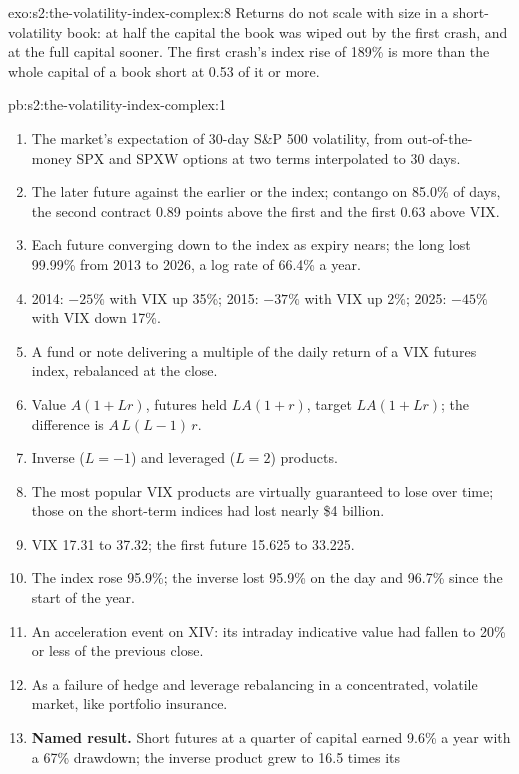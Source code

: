 \begin{solution}{exo:s2:the-volatility-index-complex:8}
Returns do not scale with size in a short-volatility book: at half the capital the book was wiped out by the first crash, and at the full capital
sooner. The first crash's index rise of 189\% is more than the whole capital of a book short at 0.53 of it or more.
\end{solution}

\begin{solution}{pb:s2:the-volatility-index-complex:1}
\begin{enumerate}
\item The market's expectation of 30-day S\&P 500 volatility, from out-of-the-money SPX and SPXW options at two terms interpolated to 30 days.
\item The later future against the earlier or the index; contango on 85.0\% of days, the second contract 0.89 points above the first and the first
0.63 above VIX.
\item Each future converging down to the index as expiry nears; the long lost 99.99\% from 2013 to 2026, a log rate of 66.4\% a year.
\item 2014: $-25\%$ with VIX up 35\%; 2015: $-37\%$ with VIX up 2\%; 2025: $-45\%$ with VIX down 17\%.
\item A fund or note delivering a multiple of the daily return of a VIX futures index, rebalanced at the close.
\item Value $A(1 + Lr)$, futures held $LA(1 + r)$, target $LA(1 + Lr)$; the difference is $A\,L(L - 1)\,r$.
\item Inverse ($L = -1$) and leveraged ($L = 2$) products.
\item The most popular VIX products are virtually guaranteed to lose over time; those on the short-term indices had lost nearly \$4 billion.
\item VIX 17.31 to 37.32; the first future 15.625 to 33.225.
\item The index rose 95.9\%; the inverse lost 95.9\% on the day and 96.7\% since the start of the year.
\item An acceleration event on XIV: its intraday indicative value had fallen to 20\% or less of the previous close.
\item As a failure of hedge and leverage rebalancing in a concentrated, volatile market, like portfolio insurance.
\item \textbf{Named result.} Short futures at a quarter of capital earned 9.6\% a year with a 67\% drawdown; the inverse product grew to 16.5 times its

\end{enumerate}
\end{solution}
